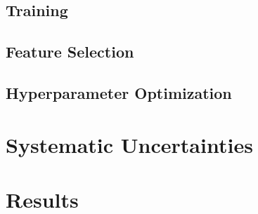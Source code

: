 		\subsection{Training}\label{ssec:training}

		\subsection{Feature Selection}\label{ssec:features}

		\subsection{Hyperparameter Optimization}\label{ssec:hpo}

	\section{Systematic Uncertainties}\label{sec:systs}

	\section{Results}\label{sec:results}

